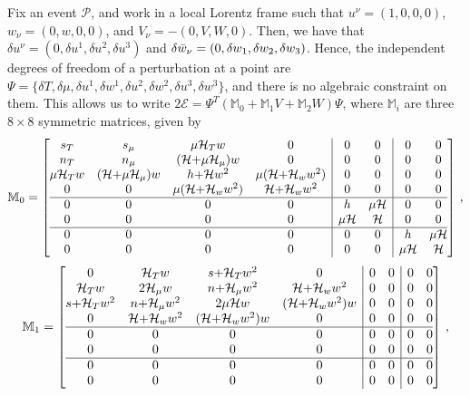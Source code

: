 \documentclass[a4paper, amsfonts, amssymb, amsmath, reprint, showkeys, nofootinbib, twoside,notitlepage,onecolumn]{revtex4-2}
\theoremstyle{definition}
\theoremstyle{theorem}
\theoremstyle{corollary}
\begin{document}
Fix an event $\mathscr{P}$, and work in a local Lorentz frame such that $u^\nu{=}(1,0,0,0)$, 
 $w_\nu{=}(0,w,0,0)$, and $V_\nu {=}-(0,V,W,0)$. Then, we have that $\delta u^\nu =(0,\delta u^1,\delta u^2, \delta u^3)$ and $\delta \Bar{w}_\nu=(0,\delta w_1, \delta w_2, \delta w_3)$. Hence, the independent degrees of freedom of a perturbation at a point are 
$\Psi=\{\delta T, \delta \mu , \delta u^1, \delta w^1 ,\delta u^2 , \delta w^2, \delta u^3, \delta w^3\}$, and there is no algebraic constraint on them. This allows us to write $2\mathcal{E}=\Psi^T (\mathbb{M}_0 + \mathbb{M}_1 V + \mathbb{M}_2 W)\Psi$, where $\mathbb{M}_i$ are three $8\times 8$ symmetric matrices, given by
\begin{equation}
\mathbb{M}_0 =
\left[
\begin{array}{@{}cccc|cc|cc@{}}
s_T & s_\mu & \mu \mathcal{H}_T w & 0 & 0 & 0 & 0 & 0\\
n_T & n_\mu & (\mathcal{H}{+}\mu \mathcal{H}_\mu)w & 0 & 0 & 0 & 0 & 0\\
\mu \mathcal{H}_T w & (\mathcal{H}{+}\mu \mathcal{H}_\mu)w & h{+}\mathcal{H}w^2 & \mu (\mathcal{H}{+}\mathcal{H}_w w^2) & 0 & 0 & 0 & 0\\
0 & 0 & \mu (\mathcal{H}{+}\mathcal{H}_w w^2) & \mathcal{H}{+}\mathcal{H}_w w^2 & 0 & 0 & 0 & 0\\
\hline
0 & 0 & 0 & 0 & h & \mu \mathcal{H} & 0 & 0\\
0 & 0 & 0 & 0 & \mu \mathcal{H} & \mathcal{H} & 0 & 0\\
\hline
0 & 0 & 0 & 0 & 0 & 0 & h & \mu \mathcal{H}\\
0 & 0 & 0 & 0 & 0 & 0 & \mu \mathcal{H} & \mathcal{H} \\
\end{array}
\right] \, ,
\end{equation}
\begin{equation}
\mathbb{M}_1 =
\left[
\begin{array}{@{}cccc|cc|cc@{}}
0 & \mathcal{H}_T w & s {+}\mathcal{H}_T w^2 & 0 & 0 & 0 & 0 & 0\\
\mathcal{H}_T w & 2\mathcal{H}_\mu w & n{+}\mathcal{H}_\mu w^2 & \mathcal{H}{+} \mathcal{H}_w  w^2 & 0 & 0 & 0 & 0\\
s{+}\mathcal{H}_T w^2 & n{+}\mathcal{H}_\mu w^2 & 2\mu \mathcal{H}w & (\mathcal{H}{+} \mathcal{H}_w  w^2)w & 0 & 0 & 0 & 0\\
0 & \mathcal{H}{+} \mathcal{H}_w  w^2 & (\mathcal{H}{+} \mathcal{H}_w  w^2)w & 0 & 0 & 0 & 0 & 0\\
\hline
0 & 0 & 0 & 0 & 0 & 0 & 0 & 0\\
0 & 0 & 0 & 0 & 0 & 0 & 0 & 0\\
\hline
0 & 0 & 0 & 0 & 0 & 0 & 0 & 0\\
0 & 0 & 0 & 0 & 0 & 0 & 0 & 0\\
\end{array} 
\right] \, ,
\end{equation}
\end{document}
